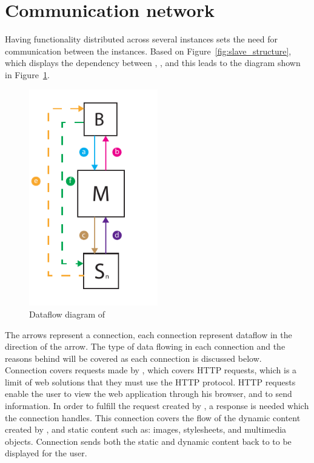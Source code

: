 \section{Communication network}\label{sec:communication_network}

Having functionality distributed across several instances sets the need for communication between the instances.
Based on Figure~\ref{fig:slave_structure}, which displays the dependency between , , and  this leads to the diagram shown in Figure~\ref{fig:dataflow_diagrem}. \\


\begin{figure}[!h]
    \centering 
    \includegraphics[width=0.5\textwidth]{gfx/dataflow_diagram.pdf}
    \caption{Dataflow diagram of \projectname{}}
    \label{fig:dataflow_diagrem}
\end{figure}


The arrows represent a connection, each connection represent dataflow in the direction of the arrow.
The type of data flowing in each connection and the reasons behind will be covered as each connection is discussed below. \\

Connection  covers requests made by , which covers HTTP requests, which is a limit of web solutions that they must use the HTTP protocol.
HTTP requests enable the user to view the web application through his browser, and to send information.
In order to fulfill the request created by , a response is needed which the connection  handles.
This connection covers the flow of the dynamic content created by , and static content such as: images, stylesheets, and multimedia objects.
Connection  sends both the static and dynamic content back to  to be displayed for the user. \\

